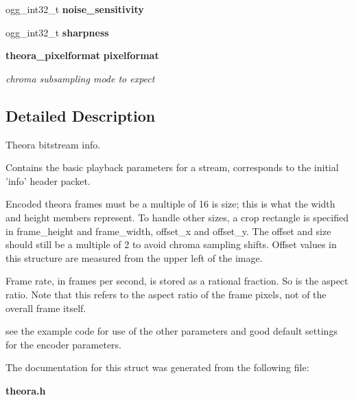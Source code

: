 \begin{CompactItemize}
\item 
ogg\_\-int32\_\-t {\bf noise\_\-sensitivity}\label{structtheora__info_c819b9b14cd2b87d6f1c143a25a8f321}

\item 
ogg\_\-int32\_\-t {\bf sharpness}\label{structtheora__info_844635956752ae709296df19a66de0e7}

\item 
{\bf theora\_\-pixelformat} {\bf pixelformat}\label{structtheora__info_37b7d715f46d0240195b3a0184e7b178}

\begin{CompactList}\small\item\em chroma subsampling mode to expect \item\end{CompactList}\end{CompactItemize}


\subsection{Detailed Description}
Theora bitstream info. 

Contains the basic playback parameters for a stream, corresponds to the initial 'info' header packet.

Encoded theora frames must be a multiple of 16 is size; this is what the width and height members represent. To handle other sizes, a crop rectangle is specified in frame\_\-height and frame\_\-width, offset\_\-x and offset\_\-y. The offset and size should still be a multiple of 2 to avoid chroma sampling shifts. Offset values in this structure are measured from the upper left of the image.

Frame rate, in frames per second, is stored as a rational fraction. So is the aspect ratio. Note that this refers to the aspect ratio of the frame pixels, not of the overall frame itself.

see the example code for use of the other parameters and good default settings for the encoder parameters. 



The documentation for this struct was generated from the following file:\begin{CompactItemize}
\item 
{\bf theora.h}\end{CompactItemize}

